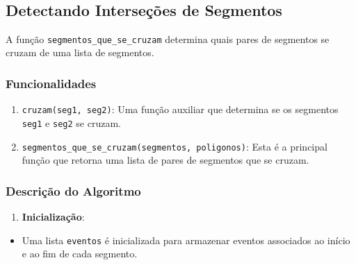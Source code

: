 \documentclass[11pt]{article}
\providecommand{\tightlist}{%
      \setlength{\itemsep}{0pt}\setlength{\parskip}{0pt}}
\begin{document}
    \begin{center}
    \end{center}
    { \hspace*{\fill} \\}
    
    \hypertarget{detectando-interseuxe7uxf5es-de-segmentos}{%
\subsection{Detectando Interseções de
Segmentos}\label{detectando-interseuxe7uxf5es-de-segmentos}}

A função \texttt{segmentos\_que\_se\_cruzam} determina quais pares de
segmentos se cruzam de uma lista de segmentos.

\hypertarget{funcionalidades}{%
\subsubsection{Funcionalidades}\label{funcionalidades}}

\begin{enumerate}
\def\labelenumi{\arabic{enumi}.}
\item
  \texttt{cruzam(seg1,\ seg2)}: Uma função auxiliar que determina se os
  segmentos \texttt{seg1} e \texttt{seg2} se cruzam.
\item
  \texttt{segmentos\_que\_se\_cruzam(segmentos,\ poligonos)}: Esta é a
  principal função que retorna uma lista de pares de segmentos que se
  cruzam.
\end{enumerate}

\hypertarget{descriuxe7uxe3o-do-algoritmo}{%
\subsubsection{Descrição do
Algoritmo}\label{descriuxe7uxe3o-do-algoritmo}}

\begin{enumerate}
\def\labelenumi{\arabic{enumi}.}
\tightlist
\item
  \textbf{Inicialização}:
\end{enumerate}

\begin{itemize}
\tightlist
\item
  Uma lista \texttt{eventos} é inicializada para armazenar eventos
  associados ao início e ao fim de cada segmento.
\end{itemize}
\end{document}
